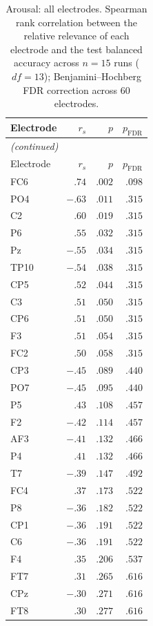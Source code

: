 {\small\setlength{\tabcolsep}{4pt}
\begin{longtable}{lrrr}
\caption{Arousal: all electrodes. Spearman rank correlation between the relative relevance of each electrode and the test balanced accuracy across $n = 15$ runs ($\mathit{df} = 13$); Benjamini--Hochberg FDR correction across 60 electrodes.}\label{tab:arousal_spearman_bacc_all} \\
\toprule
Electrode & $r_s$ & $p$ & $p_{\mathrm{FDR}}$ \\
\midrule
\endfirsthead
\multicolumn{4}{l}{\emph{(continued)}} \\
\toprule
Electrode & $r_s$ & $p$ & $p_{\mathrm{FDR}}$ \\
\midrule
\endhead
\bottomrule
\endfoot
FC6 & $.74$ & $.002$ & $.098$ \\
PO4 & $-.63$ & $.011$ & $.315$ \\
C2 & $.60$ & $.019$ & $.315$ \\
P6 & $.55$ & $.032$ & $.315$ \\
Pz & $-.55$ & $.034$ & $.315$ \\
TP10 & $-.54$ & $.038$ & $.315$ \\
CP5 & $.52$ & $.044$ & $.315$ \\
C3 & $.51$ & $.050$ & $.315$ \\
CP6 & $.51$ & $.050$ & $.315$ \\
F3 & $.51$ & $.054$ & $.315$ \\
FC2 & $.50$ & $.058$ & $.315$ \\
CP3 & $-.45$ & $.089$ & $.440$ \\
PO7 & $-.45$ & $.095$ & $.440$ \\
P5 & $.43$ & $.108$ & $.457$ \\
F2 & $-.42$ & $.114$ & $.457$ \\
AF3 & $-.41$ & $.132$ & $.466$ \\
P4 & $.41$ & $.132$ & $.466$ \\
T7 & $-.39$ & $.147$ & $.492$ \\
FC4 & $.37$ & $.173$ & $.522$ \\
P8 & $-.36$ & $.182$ & $.522$ \\
CP1 & $-.36$ & $.191$ & $.522$ \\
C6 & $-.36$ & $.191$ & $.522$ \\
F4 & $.35$ & $.206$ & $.537$ \\
FT7 & $.31$ & $.265$ & $.616$ \\
CPz & $-.30$ & $.271$ & $.616$ \\
FT8 & $.30$ & $.277$ & $.616$ \\

\end{longtable}}
